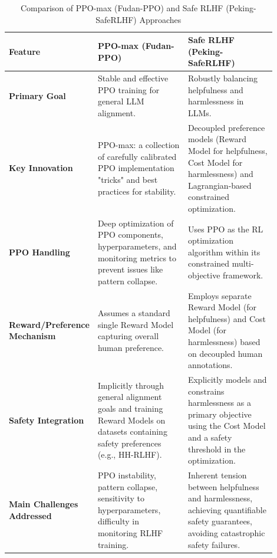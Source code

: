\documentclass{article}
\begin{document}
\begin{table}[htbp]
  \centering
  \caption{Comparison of PPO-max (Fudan-PPO) and Safe RLHF (Peking-SafeRLHF) Approaches}
  \label{tab:comparison_fudan_peking}
  \begin{tabular}{p{0.2\linewidth} p{0.35\linewidth} p{0.35\linewidth}}
    \toprule
    \textbf{Feature} & \textbf{PPO-max (Fudan-PPO) \cite{Zheng2023PPO}} & \textbf{Safe RLHF (Peking-SafeRLHF) \cite{Dai2023SafeRLHF}} \\
    \toprule
    \textbf{Primary Goal} & Stable and effective PPO training for general LLM alignment. & Robustly balancing helpfulness and harmlessness in LLMs. \\
    \midrule
    \textbf{Key Innovation} & PPO-max: a collection of carefully calibrated PPO implementation "tricks" and best practices for stability. & Decoupled preference models (Reward Model for helpfulness, Cost Model for harmlessness) and Lagrangian-based constrained optimization. \\
    \midrule
    \textbf{PPO Handling} & Deep optimization of PPO components, hyperparameters, and monitoring metrics to prevent issues like pattern collapse. & Uses PPO as the RL optimization algorithm within its constrained multi-objective framework. \\
    \midrule
    \textbf{Reward/Preference Mechanism} & Assumes a standard single Reward Model capturing overall human preference. & Employs separate Reward Model (for helpfulness) and Cost Model (for harmlessness) based on decoupled human annotations. \\
    \midrule
    \textbf{Safety Integration} & Implicitly through general alignment goals and training Reward Models on datasets containing safety preferences (e.g., HH-RLHF). & Explicitly models and constrains harmlessness as a primary objective using the Cost Model and a safety threshold in the optimization. \\
    \midrule
    \textbf{Main Challenges Addressed} & PPO instability, pattern collapse, sensitivity to hyperparameters, difficulty in monitoring RLHF training. & Inherent tension between helpfulness and harmlessness, achieving quantifiable safety guarantees, avoiding catastrophic safety failures. \\
    \bottomrule
  \end{tabular}
\end{table}
\end{document}
